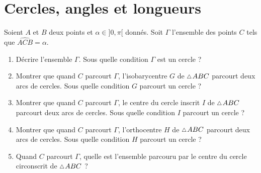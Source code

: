 \documentclass[a4paper,11pt,reqno]{amsart}
\begin{document}
\section{Cercles, angles et longueurs}

\begin{exo}

  Soient $A$ et $B$ deux points  et $\alpha \in ]0,\pi[$ donnés. Soit $\Gamma$ l'ensemble des points $C$ tels que $\widehat{ACB}=\alpha$.
  \begin{enumerate}
    \item Décrire l'ensemble $\Gamma$. Sous quelle condition $\Gamma$ est un cercle ?
    \item Montrer que quand $C$ parcourt $\Gamma$, l'isobarycentre $G$ de $\tri ABC$ parcourt deux arcs de cercles. Sous quelle condition $G$ parcourt un cercle ?
    \item Montrer que quand $C$ parcourt $\Gamma$, le centre du cercle inscrit $I$ de $\tri ABC$ parcourt deux arcs de cercles. Sous quelle condition $I$ parcourt un cercle ?
    \item Montrer que quand $C$ parcourt $\Gamma$, l'orthocentre $H$ de $\tri ABC$ parcourt deux arcs de cercles. Sous quelle condition $H$ parcourt un cercle ?
    \item Quand $C$ parcourt $\Gamma$, quelle est l'ensemble parcouru par le centre du cercle circonscrit de $\tri ABC$ ?
  \end{enumerate}
\end{exo}
\end{document}
